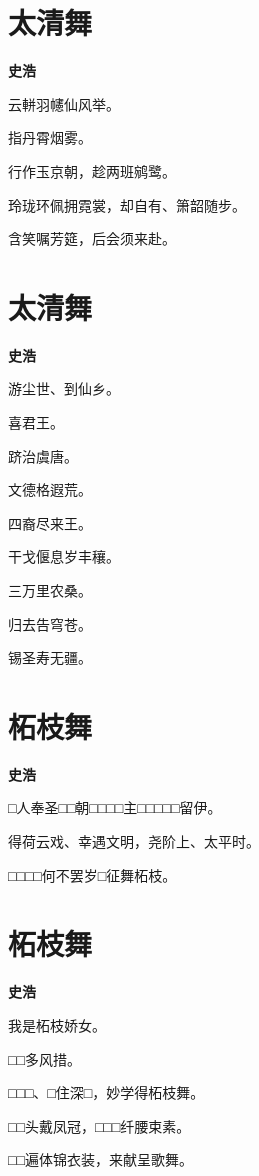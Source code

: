 \documentclass[12pt,a4paper]{ctexbook}
\begin{document}
\section{太清舞}
\textbf{史浩}\par\vspace{0.5em}
云軿羽幰仙风举。\par
指丹霄烟雾。\par
行作玉京朝，趁两班鹓鹭。\par
玲珑环佩拥霓裳，却自有、箫韶随步。\par
含笑嘱芳筵，后会须来赴。\par

\section{太清舞}
\textbf{史浩}\par\vspace{0.5em}
游尘世、到仙乡。\par
喜君王。\par
跻治虞唐。\par
文德格遐荒。\par
四裔尽来王。\par
干戈偃息岁丰穰。\par
三万里农桑。\par
归去告穹苍。\par
锡圣寿无疆。\par

\section{柘枝舞}
\textbf{史浩}\par\vspace{0.5em}
□人奉圣□□朝□□□□主□□□□□留伊。\par
得荷云戏、幸遇文明，尧阶上、太平时。\par
□□□□何不罢岁□征舞柘枝。\par

\section{柘枝舞}
\textbf{史浩}\par\vspace{0.5em}
我是柘枝娇女。\par
□□多风措。\par
□□□、□住深□，妙学得柘枝舞。\par
□□头戴凤冠，□□□纤腰束素。\par
□□遍体锦衣装，来献呈歌舞。\par
\end{document}
